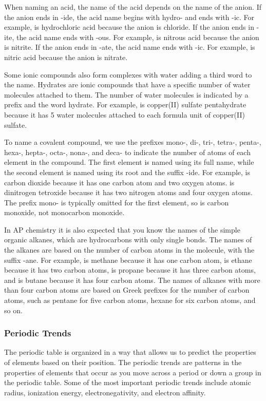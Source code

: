     When naming an acid, the name of the acid depends on the name of the anion. If the anion ends in -ide, the acid name begins with hydro- and ends with -ic. For example,  is hydrochloric acid because the anion is chloride. If the anion ends in -ite, the acid name ends with -ous. For example,  is nitrous acid because the anion is nitrite. If the anion ends in -ate, the acid name ends with -ic. For example,  is nitric acid because the anion is nitrate.

    Some ionic compounds also form complexes with water adding a third word to the name. Hydrates are ionic compounds that have a specific number of water molecules attached to them. The number of water molecules is indicated by a prefix and the word hydrate. For example,  is copper(II) sulfate pentahydrate because it has 5 water molecules attached to each formula unit of copper(II) sulfate.

    To name a covalent compound, we use the prefixes mono-, di-, tri-, tetra-, penta-, hexa-, hepta-, octa-, nona-, and deca- to indicate the number of atoms of each element in the compound. The first element is named using its full name, while the second element is named using its root and the suffix -ide. For example,  is carbon dioxide because it has one carbon atom and two oxygen atoms.  is dinitrogen tetroxide because it has two nitrogen atoms and four oxygen atoms. The prefix mono- is typically omitted for the first element, so  is carbon monoxide, not monocarbon monoxide.

    In AP chemistry it is also expected that you know the names of the simple organic alkanes, which are hydrocarbons with only single bonds. The names of the alkanes are based on the number of carbon atoms in the molecule, with the suffix -ane. For example,  is methane because it has one carbon atom,  is ethane because it has two carbon atoms,  is propane because it has three carbon atoms, and  is butane because it has four carbon atoms. The names of alkanes with more than four carbon atoms are based on Greek prefixes for the number of carbon atoms, such as pentane for five carbon atoms, hexane for six carbon atoms, and so on.

    \subsubsection{Periodic Trends}
    The periodic table is organized in a way that allows us to predict the properties of elements based on their position. The periodic trends are patterns in the properties of elements that occur as you move across a period or down a group in the periodic table. Some of the most important periodic trends include atomic radius, ionization energy, electronegativity, and electron affinity.

